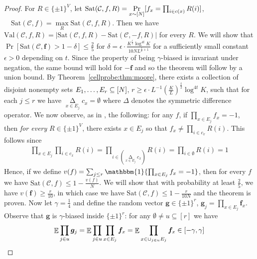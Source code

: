 \begin{proof}
For $R \in \{\pm 1\}^V$, let $
\mathrm{Sat}(\mathcal{C},f,R) = \Pr\limits_{x \sim [N]}[f_x = \prod_{i \in c(x) }R(i)]$, $ \quad \mathrm{Sat}(\mathcal{C},f) = \max\limits_{R} \mathrm{Sat}(\mathcal{C},f,R)$.
Then we have $\mathrm{Val}(\mathcal{C},f,R) = |\mathrm{Sat}(\mathcal{C},f,R) - \mathrm{Sat}(\mathcal{C},-f,R)|$ for every $R$. We will show that $ \Pr[\mathrm{Sat}(\mathcal{C},\bm{f}) > 1-\delta ] \leq \frac{2}{5}$ for $\delta =  \epsilon \cdot \frac{K^{\frac{t}{2}}\log^{4t}K}{10N L^{\frac{t}{2}+1}}$ for a sufficiently small constant $\epsilon > 0$ depending on $t$. Since the property of being $\gamma$-biased is invariant under negation, the same bound will hold for $-\bm{f}$ and so the theorem will follow by a union bound.
By Theorem~\ref{cellprobe:thm:moore}, there exists a collection of disjoint nonempty sets $E_1,\ldots,E_r \subseteq [N]$, $r \geq \epsilon \cdot L^{-1}(\frac{K}{L})^{\frac{t}{2}} \log^{4t}K$, such that for each $j \leq r$ we have $\mathop{\Delta}\limits_{x \in E_j} c_x = \emptyset$ where $\Delta$ denotes the symmetric difference operator.
We now observe, as in \cite{FKO,smoothed}, the following: for any $f$, if $\prod_{x \in E_j} f_x = -1$, then \emph{for every} $R \in \{\pm 1 \}^V$, there exists $x \in E_j$ so that $f_x \neq \prod_{i \in c_x} R(i)$. This follows since
\begin{gather*}
\prod_{x \in E_j} \prod_{i \in c_x} R(i) = \prod_{i \in (\mathop{\Delta}\limits_{x\in E_j}c_x)} R(i) = \prod_{i \in \emptyset} R(i) = 1
\end{gather*}
Hence, if we define $v(f) = \sum_{j \leq r} \mathbbm{1}\{\prod_{x \in E_j} f_x = -1\} $, then for every $f$ we have $\mathrm{Sat}(\mathcal{C},f) \leq 1 - \frac{v(f)}{N}$. We will show that with probability at least $\frac{2}{5}$, we have $v(\bm{f}) \geq \frac{r}{10}$, in which case we have $\mathrm{Sat}(\mathcal{C},f) \leq 1 - \frac{r}{10N}$ and the theorem is proven.
Now let $\gamma=  \frac{1}{4}$ and define the random vector $\bm{g} \in \{\pm 1\}^r$, $\bm{g}_j = \prod_{x \in E_j} \bm{f}_x$. Observe that $\bm{g}$ is $\gamma$-biased inside $\{\pm 1\}^r$: for any $\emptyset \neq u \subseteq [r]$ we have
\[
\mathop{\mathbb{E}}\prod_{j \in u} \bm{g}_j  = \mathop{\mathbb{E}}\prod_{j \in u}\prod_{x \in E_j} \bm{f}_x= \mathop{\mathbb{E}}\prod_{x \in \cup_{j\in u} E_j} \bm{f}_x \in [-\gamma,  \gamma]
\]
\end{proof}
